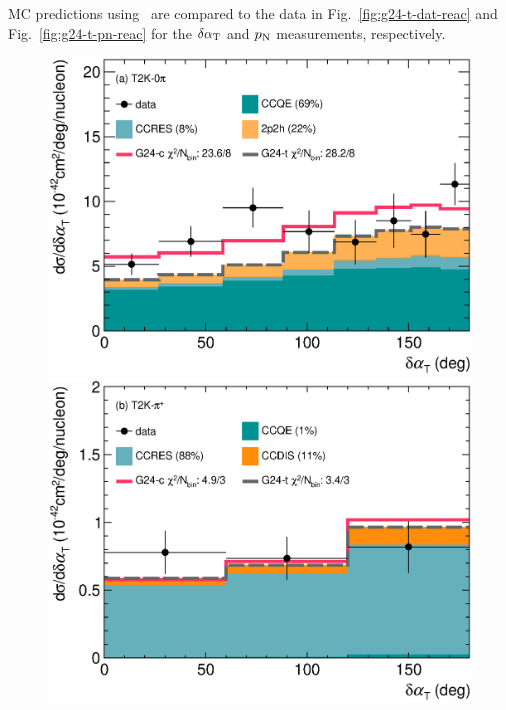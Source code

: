     MC predictions using \gT\ are compared to the data in Fig.~\ref{fig:g24-t-dat-reac} and Fig.~\ref{fig:g24-t-pn-reac} for the $\delta\alpha_\textrm{T}$ and $p_\textrm{N}$ measurements, respectively.
    \begin{figure} 
        \centering 		
        \includegraphics[width=\dbfigwid\textwidth]{figures/tuning/0013-t2k_0pi_dalphat_reac_decomp.eps}
        \includegraphics[width=\dbfigwid\textwidth]{figures/tuning/0013-t2k_pip_dalphat_reac_decomp.eps}

\end{figure}
